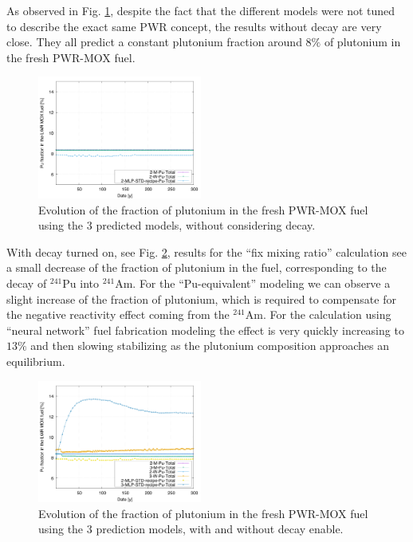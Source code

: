 \documentclass{anstrans}
\begin{document}
As observed in Fig. \ref{fig:nod}, despite the fact that the different models 
were not tuned to
describe the exact same PWR concept, the results without decay are very
close. They all predict a constant plutonium fraction around $8\%$ of plutonium
in the fresh PWR-MOX fuel.

\begin{figure}[ht] %
  \centering
  \includegraphics[width=0.48\textwidth]{nodecay_pu_contribution.png}
  \caption{Evolution of the fraction of plutonium in the fresh PWR-MOX fuel
  using the 3 predicted models, without considering decay.}
  \label{fig:nod}
\end{figure}


With decay turned on, see Fig. \ref{fig:d}, results for the ``fix mixing ratio''
calculation see a small decrease of the fraction of plutonium in the fuel,
corresponding to the decay of $^{241}$Pu into $^{241}$Am.  For the
``Pu-equivalent'' modeling we can observe a slight increase of the fraction of
plutonium, which is required to compensate for the negative reactivity effect
coming from the $^{241}$Am. For the calculation using ``neural network'' fuel
fabrication modeling the effect is very quickly increasing to $13\%$ and then
slowing stabilizing as the plutonium composition approaches an equilibrium.

\begin{figure}[ht] %
  \centering
  \includegraphics[width=0.48\textwidth]{decay_pu_contribution.png}
  \caption{Evolution of the fraction of plutonium in the fresh PWR-MOX fuel
  using the 3 prediction models, with and without decay enable.}
  \label{fig:d}
\end{figure}
\end{document}
